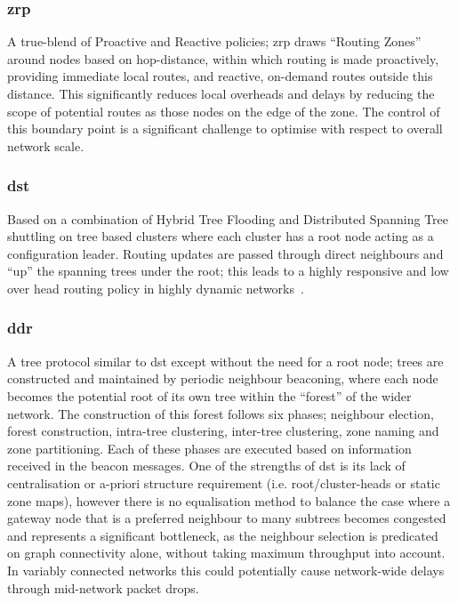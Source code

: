 {\subsubsection{\gls{zrp}}
A true-blend of Proactive and Reactive policies; \gls{zrp} draws ``Routing Zones'' around nodes based on hop-distance, within which routing is made proactively, providing immediate local routes, and reactive, on-demand routes outside this distance. This significantly reduces local overheads and delays by reducing the scope of potential routes as those nodes on the edge of the zone. The control of this boundary point is a significant challenge to optimise with respect to overall network scale.

\subsubsection{\gls{dst}}
Based on a combination of Hybrid Tree Flooding and Distributed Spanning Tree shuttling on tree based clusters where each cluster has a root node acting as a configuration leader. Routing updates are passed through direct neighbours and ``up'' the spanning trees under the root; this leads to a highly responsive and low over head routing policy in highly dynamic networks~\cite{Radhakrishnan1999}.

\subsubsection{\gls{ddr}} 
A tree protocol similar to \gls{dst} except without the need for a root node; trees are constructed and maintained by periodic neighbour beaconing, where each node becomes the potential root of its own tree within the ``forest'' of the wider network. The construction of this forest follows six phases; neighbour election, forest construction, intra-tree clustering, inter-tree clustering, zone naming and zone partitioning. Each of these phases are executed based on information received in the beacon messages. One of the strengths of \gls{dst} is its lack of centralisation or a-priori structure requirement (i.e. root/cluster-heads or static zone maps), however there is no equalisation method to balance the case where a gateway node that is a preferred neighbour to many subtrees becomes congested and represents a significant bottleneck, as the neighbour selection is predicated on graph connectivity alone, without taking maximum throughput into account. In variably connected networks this could potentially cause network-wide delays through mid-network packet drops.

}
